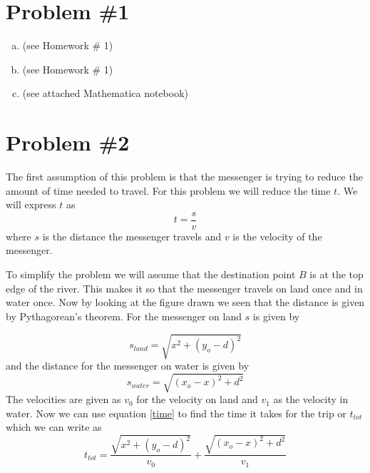 \documentclass[11pt]{article}
\numberwithin{equation}{section}
\begin{document}


\section{Problem \#1}
\begin{enumerate}[(a)]
\item(see Homework \# 1)
\item(see Homework \# 1)
\item(see attached Mathematica notebook)
\end{enumerate}

\section{Problem \#2}
The first assumption of this problem is that the messenger is trying to reduce the amount of time needed to travel. For this problem we will reduce the time $t$. We will express $t$ as 
\begin{equation}
t=\frac{s}{v}
\label{time}
\end{equation} 
where $s$ is the distance the messenger travels and $v$ is the velocity of the messenger.

To simplify the problem we will assume that the destination point $B$ is at the top edge of the river. This makes it so that the messenger travels on land once and in water once. Now by looking at the figure drawn we seen that the distance is given by Pythagorean's theorem. For the messenger on land $s$ is given by 

$$s_{land} = \sqrt{x^2 + (y_o - d)^2}$$ 
and the distance for the messenger on water is given by 
$$s_{water} = \sqrt{(x_o - x)^2 + d^2}$$ 
The velocities are given as $v_0$ for the velocity on land and $v_1$ as the velocity in water. Now we can use equation \ref{time} to find the time it takes for the trip or $t_{tot}$ which we can write as
\begin{equation}
t_{tot} = \frac{\sqrt{x^2 + (y_o - d)^2}}{v_0} + \frac{\sqrt{(x_o - x)^2 + d^2}}{v_1}
\label{ttot}
\end{equation}
\end{document}
